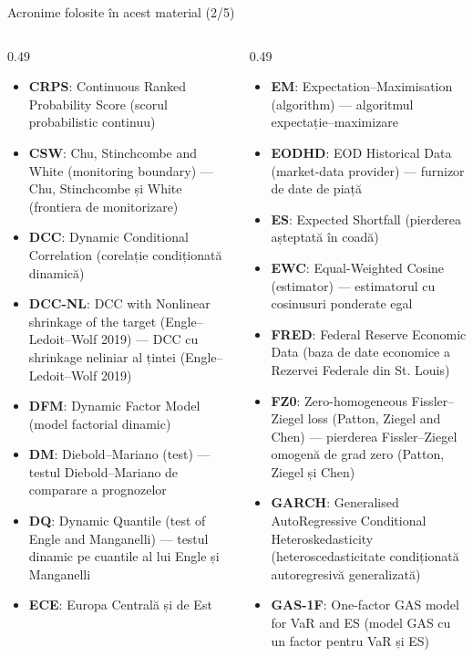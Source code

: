 \begin{frame}{Acronime folosite în acest material (2/5)}
\begin{columns}[T]
\begin{column}{0.49\textwidth}
\begin{itemize}\setlength{\itemsep}{0pt}
    \item \textbf{CRPS}: Continuous Ranked Probability Score (scorul probabilistic continuu)
    \item \textbf{CSW}: Chu, Stinchcombe and White (monitoring boundary) — Chu, Stinchcombe și White (frontiera de monitorizare)
    \item \textbf{DCC}: Dynamic Conditional Correlation (corelație condiționată dinamică)
    \item \textbf{DCC-NL}: DCC with Nonlinear shrinkage of the target (Engle–Ledoit–Wolf 2019) — DCC cu shrinkage neliniar al țintei (Engle–Ledoit–Wolf 2019)
    \item \textbf{DFM}: Dynamic Factor Model (model factorial dinamic)
    \item \textbf{DM}: Diebold–Mariano (test) — testul Diebold–Mariano de comparare a prognozelor
    \item \textbf{DQ}: Dynamic Quantile (test of Engle and Manganelli) — testul dinamic pe cuantile al lui Engle și Manganelli
    \item \textbf{ECE}: Europa Centrală și de Est
\end{itemize}
\end{column}
\begin{column}{0.49\textwidth}
\begin{itemize}\setlength{\itemsep}{0pt}
    \item \textbf{EM}: Expectation–Maximisation (algorithm) — algoritmul expectație–maximizare
    \item \textbf{EODHD}: EOD Historical Data (market-data provider) — furnizor de date de piață
    \item \textbf{ES}: Expected Shortfall (pierderea așteptată în coadă)
    \item \textbf{EWC}: Equal-Weighted Cosine (estimator) — estimatorul cu cosinusuri ponderate egal
    \item \textbf{FRED}: Federal Reserve Economic Data (baza de date economice a Rezervei Federale din St. Louis)
    \item \textbf{FZ0}: Zero-homogeneous Fissler–Ziegel loss (Patton, Ziegel and Chen) — pierderea Fissler–Ziegel omogenă de grad zero (Patton, Ziegel și Chen)
    \item \textbf{GARCH}: Generalised AutoRegressive Conditional Heteroskedasticity (heteroscedasticitate condiționată autoregresivă generalizată)
    \item \textbf{GAS-1F}: One-factor GAS model for VaR and ES (model GAS cu un factor pentru VaR și ES)
\end{itemize}
\end{column}
\end{columns}
\end{frame}

